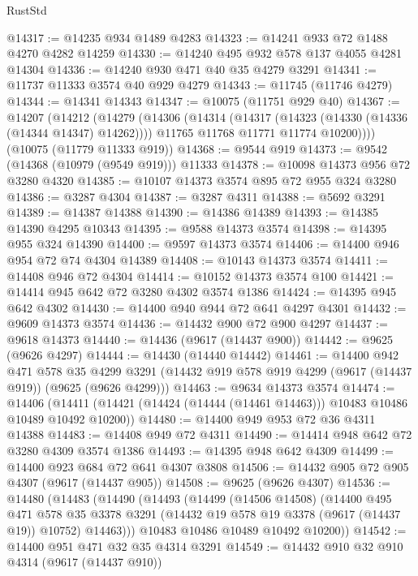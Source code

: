 \begin{lexlean}{RustStd}
\begin{coremodule}
@14317 := @14235 @934 @1489 @4283
@14323 := @14241 @933 @72 @1488 @4270 @4282 @14259
@14330 := @14240 @495 @932 @578 @137 @4055 @4281 @14304
@14336 := @14240 @930 @471 @40 @35 @4279 @3291
@14341 := @11737 @11333 @3574 @40 @929 @4279
@14343 := @11745 (@11746 @4279)
@14344 := @14341 @14343
@14347 := @10075 (@11751 @929 @40)
@14367 := @14207
    (@14212
      (@14279
        (@14306
          (@14314
            (@14317 (@14323 (@14330 (@14336 (@14344 @14347) @14262))))
            @11765
            @11768
            @11771
            @11774
            @10200))))
    (@10075 (@11779 @11333 @919))
@14368 := @9544 @919
@14373 := @9542 (@14368 (@10979 (@9549 @919))) @11333
@14378 := @10098 @14373 @956 @72 @3280 @4320
@14385 := @10107 @14373 @3574 @895 @72 @955 @324 @3280
@14386 := @3287 @4304
@14387 := @3287 @4311
@14388 := @5692 @3291
@14389 := @14387 @14388
@14390 := @14386 @14389
@14393 := @14385 @14390 @4295 @10343
@14395 := @9588 @14373 @3574
@14398 := @14395 @955 @324 @14390
@14400 := @9597 @14373 @3574
@14406 := @14400 @946 @954 @72 @74 @4304 @14389
@14408 := @10143 @14373 @3574
@14411 := @14408 @946 @72 @4304
@14414 := @10152 @14373 @3574 @100
@14421 := @14414 @945 @642 @72 @3280 @4302 @3574 @1386
@14424 := @14395 @945 @642 @4302
@14430 := @14400 @940 @944 @72 @641 @4297 @4301
@14432 := @9609 @14373 @3574
@14436 := @14432 @900 @72 @900 @4297
@14437 := @9618 @14373
@14440 := @14436 (@9617 (@14437 @900))
@14442 := @9625 (@9626 @4297)
@14444 := @14430 (@14440 @14442)
@14461 := @14400
    @942
    @471
    @578
    @35
    @4299
    @3291
    (@14432 @919 @578 @919 @4299 (@9617 (@14437 @919)) (@9625 (@9626 @4299)))
@14463 := @9634 @14373 @3574
@14474 := @14406
    (@14411 (@14421 (@14424 (@14444 (@14461 @14463))) @10483 @10486 @10489 @10492 @10200))
@14480 := @14400 @949 @953 @72 @36 @4311 @14388
@14483 := @14408 @949 @72 @4311
@14490 := @14414 @948 @642 @72 @3280 @4309 @3574 @1386
@14493 := @14395 @948 @642 @4309
@14499 := @14400 @923 @684 @72 @641 @4307 @3808
@14506 := @14432 @905 @72 @905 @4307 (@9617 (@14437 @905))
@14508 := @9625 (@9626 @4307)
@14536 := @14480
    (@14483
      (@14490
        (@14493
          (@14499
            (@14506 @14508)
            (@14400
              @495
              @471
              @578
              @35
              @3378
              @3291
              (@14432 @19 @578 @19 @3378 (@9617 (@14437 @19)) @10752)
              @14463)))
        @10483
        @10486
        @10489
        @10492
        @10200))
@14542 := @14400 @951 @471 @32 @35 @4314 @3291
@14549 := @14432 @910 @32 @910 @4314 (@9617 (@14437 @910))

\end{coremodule}
\end{lexlean}
